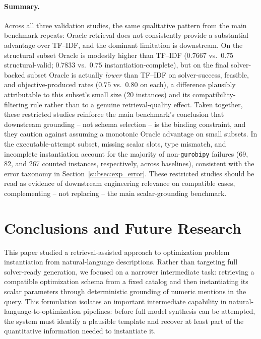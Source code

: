 \documentclass[pdflatex,sn-basic,Numbered]{sn-jnl}
\begin{document}
\paragraph{Summary.} Across all three validation studies, the same qualitative pattern from the main benchmark repeats: Oracle retrieval does not consistently provide a substantial advantage over TF--IDF, and the dominant limitation is downstream. On the structural subset Oracle is modestly higher than TF--IDF ($0.7667$ vs.\ $0.75$ structural-valid; $0.7833$ vs.\ $0.75$ instantiation-complete), but on the final solver-backed subset Oracle is actually \emph{lower} than TF--IDF on solver-success, feasible, and objective-produced rates ($0.75$ vs.\ $0.80$ on each), a difference plausibly attributable to this subset's small size (20 instances) and its compatibility-filtering rule rather than to a genuine retrieval-quality effect. Taken together, these restricted studies reinforce the main benchmark's conclusion that downstream grounding -- not schema selection -- is the binding constraint, and they caution against assuming a monotonic Oracle advantage on small subsets. In the executable-attempt subset, missing scalar slots, type mismatch, and incomplete instantiation account for the majority of non-\texttt{gurobipy} failures (69, 82, and 267 counted instances, respectively, across baselines), consistent with the error taxonomy in Section~\ref{subsec:exp_error}. These restricted studies should be read as evidence of downstream engineering relevance on compatible cases, complementing -- not replacing -- the main scalar-grounding benchmark.

\section{Conclusions and Future Research}
\label{sec:conclusion}

This paper studied a retrieval-assisted approach to optimization problem instantiation from natural-language descriptions. Rather than targeting full solver-ready generation, we focused on a narrower intermediate task: retrieving a compatible optimization schema from a fixed catalog and then instantiating its scalar parameters through deterministic grounding of numeric mentions in the query. This formulation isolates an important intermediate capability in natural-language-to-optimization pipelines: before full model synthesis can be attempted, the system must identify a plausible template and recover at least part of the quantitative information needed to instantiate it.
\end{document}
